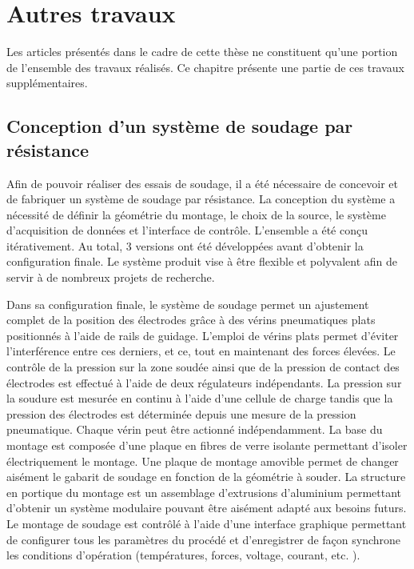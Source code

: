 \label{sec:Discussion}

\section{Autres travaux}

Les articles présentés dans le cadre de cette thèse ne constituent qu'une portion de l'ensemble des travaux réalisés. 
Ce chapitre présente une partie de ces travaux supplémentaires. 

\subsection{Conception d'un système de soudage par résistance}

Afin de pouvoir réaliser des essais de soudage, il a été nécessaire de concevoir et de fabriquer un système de soudage par résistance. 
La conception du système a nécessité de définir la géométrie du montage, le choix de la source, le système d'acquisition de données et l'interface de contrôle. 
L'ensemble a été conçu itérativement.
Au total, 3 versions ont été développées avant d'obtenir la configuration finale. 
Le système produit vise à être flexible et polyvalent afin de servir à de nombreux projets de recherche. 

Dans sa configuration finale, le système de soudage permet un ajustement complet de la position des électrodes grâce à des vérins pneumatiques plats positionnés à l'aide de rails de guidage. 
L'emploi de vérins plats permet d'éviter l'interférence entre ces derniers, et ce, tout en maintenant des forces élevées. 
Le contrôle de la pression sur la zone soudée ainsi que de la pression de contact des électrodes est effectué à l'aide de deux régulateurs indépendants. 
La pression sur la soudure est mesurée en continu à l'aide d'une cellule de charge tandis que la pression des électrodes est déterminée depuis une mesure de la pression pneumatique. 
Chaque vérin peut être actionné indépendamment. 
La base du montage est composée d'une plaque en fibres de verre isolante permettant d'isoler électriquement le montage. 
Une plaque de montage amovible permet de changer aisément le gabarit de soudage en fonction de la géométrie à souder. 
La structure en portique du montage est un assemblage d'extrusions d'aluminium permettant d'obtenir un système modulaire pouvant être aisément adapté aux besoins futurs. 
Le montage de soudage est contrôlé à l'aide d'une interface graphique permettant de configurer tous les paramètres du procédé et d'enregistrer de façon synchrone les conditions d'opération (températures, forces, voltage, courant, etc. ). 

